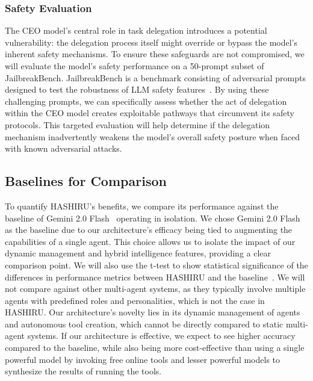 \documentclass[conference]{IEEEtran}
\begin{document}
\subsubsection{Safety Evaluation}
The CEO model's central role in task delegation introduces a potential vulnerability: the delegation process itself might override or bypass the model's inherent safety mechanisms. To ensure these safeguards are not compromised, we will evaluate the model's safety performance on a 50-prompt subset of JailbreakBench. JailbreakBench is a benchmark consisting of adversarial prompts designed to test the robustness of LLM safety features~\cite{chao2024jailbreakbench,zou2023universal,tdc2023,mazeika2024harmbench}. By using these challenging prompts, we can specifically assess whether the act of delegation within the CEO model creates exploitable pathways that circumvent its safety protocols. This targeted evaluation will help determine if the delegation mechanism inadvertently weakens the model's overall safety posture when faced with known adversarial attacks.

\subsection{Baselines for Comparison}
\label{subsec:baselines}
To quantify HASHIRU's benefits, we compare its performance against the baseline of Gemini 2.0 Flash~\cite{gemini20flash} operating in isolation.
We chose Gemini 2.0 Flash as the baseline due to our architecture's efficacy being tied to augmenting the capabilities of a single agent. This choice allows us to isolate the impact of our dynamic management and hybrid intelligence features, providing a clear comparison point.
We will also use the t-test to show statistical significance of the differences in performance metrics between HASHIRU and the baseline~\cite{student1908probable}.
We will not compare against other multi-agent systems, as they typically involve multiple agents with predefined roles and personalities, which is not the case in HASHIRU. Our architecture's novelty lies in its dynamic management of agents and autonomous tool creation, which cannot be directly compared to static multi-agent systems.
If our architecture is effective, we expect to see higher accuracy compared to the baseline, while also being more cost-effective than using a single powerful model by invoking free online tools and lesser powerful models to synthesize the results of running the tools.
\end{document}
